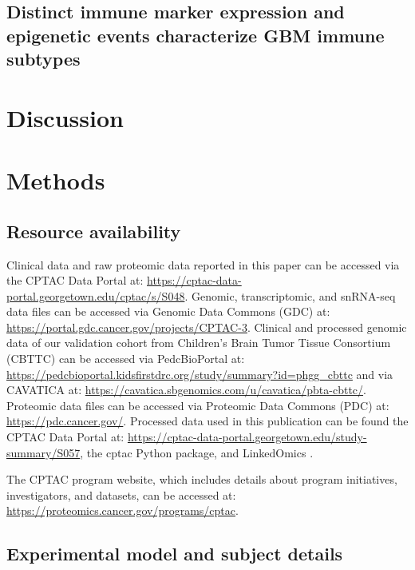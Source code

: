 \subsection{Distinct immune marker expression and epigenetic events characterize GBM immune subtypes}



\section{Discussion}



\section{Methods}


\subsection{Resource availability}
Clinical data and raw proteomic data reported in this paper can be accessed via the CPTAC Data Portal at: \url{https://cptac-data-portal.georgetown.edu/cptac/s/S048}. Genomic, transcriptomic, and snRNA-seq data files can be accessed via Genomic Data Commons (GDC) at: \url{https://portal.gdc.cancer.gov/projects/CPTAC-3}. Clinical and processed genomic data of our validation cohort from Children’s Brain Tumor Tissue Consortium (CBTTC) can be accessed via PedcBioPortal at: \url{https://pedcbioportal.kidsfirstdrc.org/study/summary?id=phgg_cbttc} and via CAVATICA at: \url{https://cavatica.sbgenomics.com/u/cavatica/pbta-cbttc/}. Proteomic data files can be accessed via Proteomic Data Commons (PDC) at: \url{https://pdc.cancer.gov/}. Processed data used in this publication can be found the CPTAC Data Portal at: \url{https://cptac-data-portal.georgetown.edu/study-summary/S057}, the cptac Python package, and LinkedOmics \cite{vasaikarsv_zhangb:LinkedOmicsAnalyzing2018}.

The CPTAC program website, which includes details about program initiatives, investigators, and datasets, can be accessed at: \url{https://proteomics.cancer.gov/programs/cptac}.


\subsection{Experimental model and subject details}


